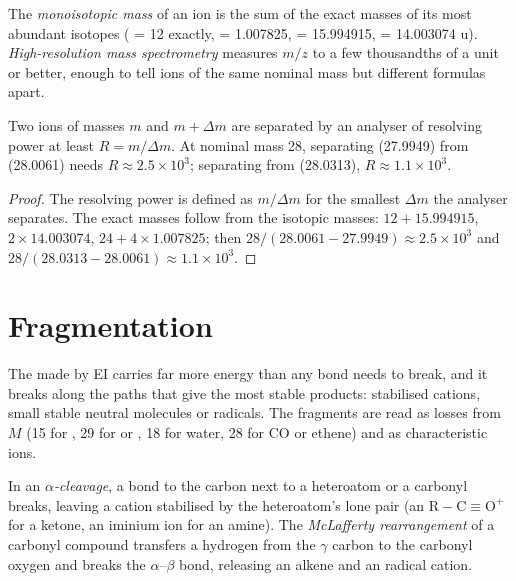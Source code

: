 \begin{definition}\label{def:b2:mass-spec-atomic:exact-mass}
The \emph{monoisotopic mass} of an ion is the sum of the exact masses of its
most abundant isotopes ( = 12 exactly,  = 1.007825,  = 15.994915,
 = 14.003074 u). \emph{High-resolution mass spectrometry}
measures $m/z$ to a few thousandths of a unit or better, enough to tell ions of the same
nominal mass but different formulas apart.
\end{definition}

\begin{proposition}\label{prop:b2:mass-spec-atomic:resolving}
Two ions of masses $m$ and $m + \Delta m$ are separated by an analyser of resolving power at least
$R = m/\Delta m$. At nominal mass 28, separating  (27.9949) from  (28.0061) needs $R
\approx 2.5 \times 10^3$; separating  from  (28.0313), $R \approx 1.1 \times 10^3$.
\end{proposition}

\begin{proof}
The resolving power is defined as $m/\Delta m$ for the smallest $\Delta m$ the analyser separates. The
exact masses follow from the isotopic masses: $12 + 15.994915$, $2 \times 14.003074$, $24 + 4 \times
1.007825$; then $28/(28.0061 - 27.9949) \approx 2.5 \times 10^3$ and $28/(28.0313 - 28.0061) \approx
1.1 \times 10^3$.
\end{proof}

\section{Fragmentation}

The  made by EI carries far more energy than any bond needs to break, and it breaks along
the paths that give the most stable products: stabilised cations, small stable neutral molecules or
radicals. The fragments are read as losses from $M$ (15 for , 29 for  or , 18
for water, 28 for CO or ethene) and as characteristic ions.

\begin{definition}\label{def:b2:mass-spec-atomic:fragmentation}
In an \emph{$\alpha$-cleavage}, a bond to the carbon next to a
heteroatom or a carbonyl breaks, leaving a cation stabilised by the heteroatom's lone pair (an  $\mathrm{R{-}C{\equiv}O^+}$ for a ketone, an iminium ion for an amine). The \emph{McLafferty
rearrangement} of a carbonyl compound transfers a hydrogen from the
$\gamma$ carbon to the carbonyl oxygen and breaks the $\alpha$--$\beta$ bond, releasing an alkene and an
 radical cation.
\end{definition}

